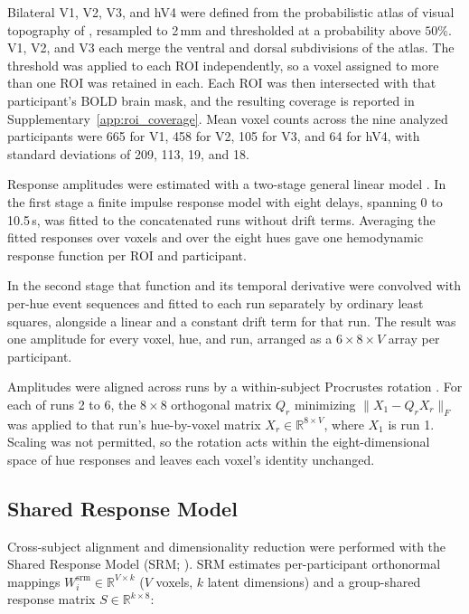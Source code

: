 Bilateral V1, V2, V3, and hV4 were defined from the probabilistic atlas of visual topography of \textcite{wang2015}, resampled to 2\,mm and thresholded at a probability above $50\%$. V1, V2, and V3 each merge the ventral and dorsal subdivisions of the atlas. The threshold was applied to each ROI independently, so a voxel assigned to more than one ROI was retained in each. Each ROI was then intersected with that participant's BOLD brain mask, and the resulting coverage is reported in Supplementary~\cref{app:roi_coverage}. Mean voxel counts across the nine analyzed participants were 665 for V1, 458 for V2, 105 for V3, and 64 for hV4, with standard deviations of 209, 113, 19, and 18.

Response amplitudes were estimated with a two-stage general linear model \parencite{dale1999, brouwer2009, brouwer2013}. In the first stage a finite impulse response model with eight delays, spanning 0 to 10.5\,s, was fitted to the concatenated runs without drift terms. Averaging the fitted responses over voxels and over the eight hues gave one hemodynamic response function per ROI and participant.

In the second stage that function and its temporal derivative were convolved with per-hue event sequences and fitted to each run separately by ordinary least squares, alongside a linear and a constant drift term for that run. The result was one amplitude for every voxel, hue, and run, arranged as a $6 \times 8 \times V$ array per participant.

Amplitudes were aligned across runs by a within-subject Procrustes rotation \parencite{gower1975}. For each of runs 2 to 6, the $8 \times 8$ orthogonal matrix $Q_r$ minimizing $\|X_1 - Q_r X_r\|_F$ was applied to that run's hue-by-voxel matrix $X_r \in \mathbb{R}^{8 \times V}$, where $X_1$ is run 1. Scaling was not permitted, so the rotation acts within the eight-dimensional space of hue responses and leaves each voxel's identity unchanged.

\subsection{Shared Response Model}
\label{sec:methods:srm}

Cross-subject alignment and dimensionality reduction were performed with the Shared Response Model (SRM; \citealp{chen2015}). SRM estimates per-participant orthonormal mappings $W^{\mathrm{srm}}_i \in \mathbb{R}^{V \times k}$ ($V$ voxels, $k$ latent dimensions) and a group-shared response matrix $S \in \mathbb{R}^{k \times 8}$:

